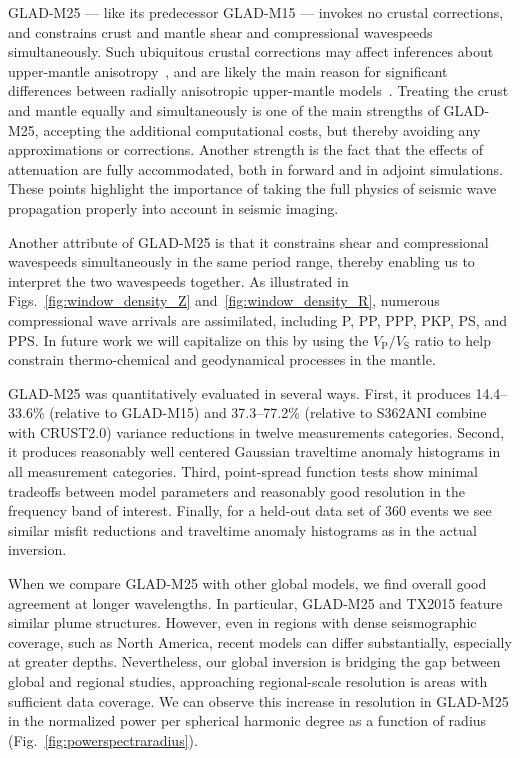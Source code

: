 \documentclass[extra,mreferee]{gji}
\begin{document}
GLAD-M25 --- like its predecessor GLAD-M15 --- invokes no crustal corrections, and constrains crust and mantle shear and compressional wavespeeds simultaneously.
Such ubiquitous crustal corrections may affect inferences about upper-mantle anisotropy~\citep[e.g.,][]{BozdagTrampert2008,PaLeRo10,Ferreira10}, and are likely the main reason for significant differences between radially anisotropic upper-mantle models~\citep[e.g.,][]{Chang14}.
Treating the crust and mantle equally and simultaneously is one of the main strengths of GLAD-M25, accepting the additional computational costs, but thereby avoiding any approximations or corrections.
Another strength is the fact that the effects of attenuation are fully accommodated, both in forward and in adjoint simulations.
These points highlight the importance of taking the full physics of seismic wave propagation properly into account in seismic imaging. 

Another attribute of GLAD-M25 is that it constrains shear and compressional wavespeeds simultaneously in the same period range,
thereby enabling us to interpret the two wavespeeds together.
As illustrated in Figs.~\ref{fig:window_density_Z} and~\ref{fig:window_density_R},
numerous compressional wave arrivals are assimilated, including P, PP, PPP, PKP, PS, and PPS.
In future work we will capitalize on this by using the $V_\text{P}/V_\text{S}$ ratio to help constrain thermo-chemical and geodynamical processes in the mantle.

GLAD-M25 was quantitatively evaluated in several ways.
First, it produces 14.4--33.6\% (relative to GLAD-M15) and 37.3--77.2\% (relative to S362ANI combine with CRUST2.0) variance
reductions in twelve measurements categories.
Second,
it produces reasonably well centered Gaussian traveltime anomaly histograms
in all measurement categories.
Third, point-spread function tests show minimal tradeoffs between model parameters and reasonably good resolution in the frequency band of interest.
Finally,
for a held-out data set of 360 events
we see similar misfit reductions and traveltime anomaly histograms as in the actual inversion.

When we compare GLAD-M25 with other global models,
we find overall good agreement at longer wavelengths.
In particular, GLAD-M25 and TX2015 feature similar plume structures.
However, even in regions with dense seismographic coverage, such as North America,
recent models can differ substantially, especially at greater depths.
Nevertheless, our global inversion is bridging the gap between global and regional studies,
approaching regional-scale resolution is areas with sufficient data coverage.
We can observe this increase in resolution in GLAD-M25 in the normalized power per spherical harmonic degree as a function of radius (Fig.~\ref{fig:powerspectraradius}).
\end{document}
